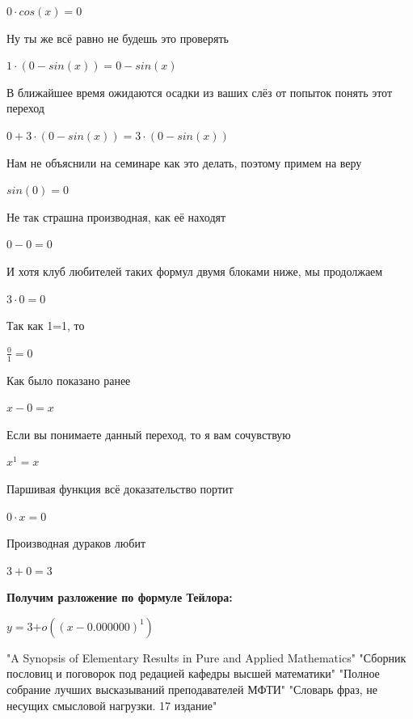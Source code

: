 \documentclass[12pt,a4paper,fleqn]{article}
\begin{document}
\begin{center}
$0 \cdot cos(x) = 0$\end{center}
Ну ты же всё равно не будешь это проверять

\begin{center}
$1 \cdot (0-sin(x)) = 0-sin(x)$\end{center}
В ближайшее время ожидаются осадки из ваших слёз от попыток понять этот переход

\begin{center}
$0+3 \cdot (0-sin(x)) = 3 \cdot (0-sin(x))$\end{center}
Нам не объяснили на семинаре как это делать, поэтому примем на веру

\begin{center}$sin(0) = 0$\end{center}
Не так страшна производная, как её находят\cite{link2}

\begin{center}$0-0 = 0$\end{center}
И хотя клуб любителей таких формул двумя блоками ниже, мы продолжаем

\begin{center}$3 \cdot 0 = 0$\end{center}
Так как 1=1, то\cite{link4}

\begin{center}$\frac{0}{1} = 0$\end{center}
Как было показано ранее

\begin{center}
$x-0 = x$\end{center}
Если вы понимаете данный переход, то я вам сочувствую

\begin{center}
$x^{1} = x$\end{center}
Паршивая функция всё доказательство портит\cite{link2}

\begin{center}
$0 \cdot x = 0$\end{center}
Производная дураков любит\cite{link2}

\begin{center}$3+0 = 3$\end{center}
\textbf{\LARGE{Получим разложение по формуле Тейлора:}}
\begin{center}
$y = $$3$$ + o((x - 0.000000)^{1})$
\end{center}
\newpage\begin{thebibliography}{}
  "A Synopsis of Elementary Results in Pure and Applied Mathematics"
  "Сборник пословиц и поговорок под редацией кафедры высшей математики"
  "Полное собрание лучших высказываний преподавателей МФТИ"
  "Словарь фраз, не несущих смысловой нагрузки. 17 издание"
\end{thebibliography}
\end{document}
